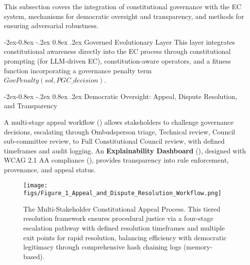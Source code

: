 \documentclass[manuscript,screen,9pt]{acmart}
\makeatletter
\renewcommand\subsubsection{\@startsection{subsubsection}{3}{\z@}%
  {-2ex\@plus -0.8ex \@minus -.2ex}%
  {0.8ex \@plus .2ex}%
  {\normalfont\normalsize\bfseries}}
\makeatother
\begin{document}
This subsection covers the integration of constitutional governance with the EC system, mechanisms for democratic oversight and transparency, and methods for ensuring adversarial robustness.

\subsubsection{Governed Evolutionary Layer}
\label{subsubsec:governed_evolutionary_layer}
This layer integrates constitutional awareness directly into the EC process through constitutional prompting (for LLM-driven EC), constitution-aware operators, and a fitness function incorporating a governance penalty term $GovPenalty(sol, PGC\_decision)$.

\subsubsection{Democratic Oversight: Appeal, Dispute Resolution, and Transparency}
\label{subsubsec:democratic_oversight_transparency} 

A multi-stage appeal workflow () allows stakeholders to challenge governance decisions, escalating through Ombudsperson triage, Technical review, Council sub-committee review, to Full Constitutional Council review, with defined timeframes and audit logging. An \textbf{Explainability Dashboard} (), designed with WCAG 2.1 AA compliance (), provides transparency into rule enforcement, provenance, and appeal status.

\FloatBarrier %
\begin{figure}[!htb]
\centering
\texttt{[image: figs/Figure\_1\_Appeal\_and\_Dispute\_Resolution\_Workflow.png]}
\caption[Multi-Stakeholder Constitutional Appeal Process]{The Multi-Stakeholder Constitutional Appeal Process. This tiered resolution framework ensures procedural justice via a four-stage escalation pathway with defined resolution timeframes and multiple exit points for rapid resolution, balancing efficiency with democratic legitimacy through comprehensive hash chaining logs (memory-based).}
\label{fig:appeal_workflow}
\end{figure}
\end{document}
